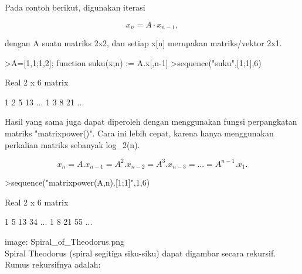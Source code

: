 \documentclass[a4paper,10pt]{article}
\begin{document}
\begin{eulernotebook}
\begin{eulercomment}
\begin{eulercomment}
\begin{eulercomment}
\begin{eulercomment}
\begin{eulercomment}
Pada contoh berikut, digunakan iterasi

\end{eulercomment}
\begin{eulerformula}
\[
x_n =A \cdot x_{n-1},
\]
\end{eulerformula}
\begin{eulercomment}
dengan A suatu matriks 2x2, dan setiap x[n] merupakan matriks/vektor 2x1.
\end{eulercomment}
\begin{eulerprompt}
>A=[1,1;1,2]; function suku(x,n) := A.x[,n-1]
>sequence("suku",[1;1],6)
\end{eulerprompt}
\begin{euleroutput}
  Real 2 x 6 matrix
  
              1             2             5            13     ...
              1             3             8            21     ...
\end{euleroutput}
\begin{eulercomment}
Hasil yang sama juga dapat diperoleh dengan menggunakan fungsi perpangkatan matriks
"matrixpower()". Cara ini lebih cepat, karena hanya menggunakan perkalian matriks sebanyak
log\_2(n).

\end{eulercomment}
\begin{eulerformula}
\[
x_n=A.x_{n-1}=A^2.x_{n-2}=A^3.x_{n-3}= ... = A^{n-1}.x_1.
\]
\end{eulerformula}
\begin{eulerprompt}
>sequence("matrixpower(A,n).[1;1]",1,6)
\end{eulerprompt}
\begin{euleroutput}
  Real 2 x 6 matrix
  
              1             5            13            34     ...
              1             8            21            55     ...
\end{euleroutput}
\begin{eulercomment}
image: Spiral\_of\_Theodorus.png\\
Spiral Theodorus (spiral segitiga siku-siku) dapat digambar secara rekursif. Rumus
rekursifnya adalah:


\end{eulercomment}
\end{eulercomment}
\end{eulercomment}
\end{eulercomment}
\end{eulercomment}
\end{eulernotebook}
\end{document}
